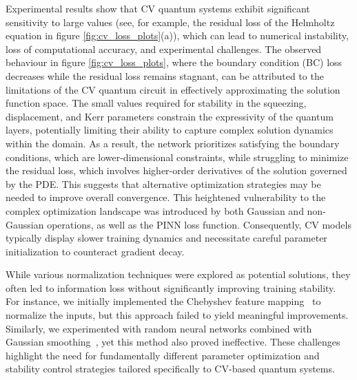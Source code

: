 Experimental results show that CV quantum systems exhibit significant sensitivity to large values (see, for example, the residual loss of the Helmholtz equation in figure \ref{fig:cv_loss_plots}(a)), which can lead to numerical instability, loss of computational accuracy, and experimental challenges. 
%
The observed behaviour in figure \ref{fig:cv_loss_plots}, where the boundary condition (BC) loss decreases while the residual loss remains stagnant, can be attributed to the limitations of the CV quantum circuit in effectively approximating the solution function space. The small values required for stability in the squeezing, displacement, and Kerr parameters constrain the expressivity of the quantum layers, potentially limiting their ability to capture complex solution dynamics within the domain. As a result, the network prioritizes satisfying the boundary conditions, which are lower-dimensional constraints, while struggling to minimize the residual loss, which involves higher-order derivatives of the solution governed by the PDE. This suggests that alternative optimization strategies may be needed to improve overall convergence.
%
This heightened vulnerability to the complex optimization landscape was introduced by both Gaussian and non-Gaussian operations, as well as the PINN loss function. Consequently, CV models typically display slower training dynamics and necessitate careful parameter initialization to counteract gradient decay. 


While various normalization techniques were explored as potential solutions, they often led to information loss without significantly improving training stability. For instance, we initially implemented the Chebyshev feature mapping~\cite{oz2023efficient, kyriienko2021solving} to normalize the inputs, but this approach failed to yield meaningful improvements. Similarly, we experimented with random neural networks combined with Gaussian smoothing~\cite{dees2024unsupervised}, yet this method also proved ineffective. These challenges highlight the need for fundamentally different parameter optimization and stability control strategies tailored specifically to CV-based quantum systems.

